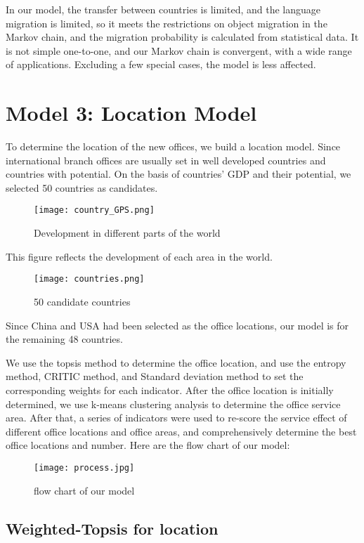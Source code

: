 \documentclass[12pt]{article}  %
\begin{document}
In our model, the transfer between countries is limited, and the language migration is limited, so it meets the restrictions on object migration in the Markov chain, and the migration probability is calculated from statistical data. It is not simple one-to-one, and our Markov chain is convergent, with a wide range of applications. Excluding a few special cases, the model is less affected.

\section{Model 3: Location Model}
To determine the location of the new offices, we build a location model. Since international branch offices are usually set in well developed countries and countries with potential. On the basis of countries' GDP and their potential, we selected 50 countries as candidates. 

\begin{figure}[H]
	\centering
	\texttt{[image: country\_GPS.png]}
	\caption{Development in different parts of the world}\label{fig:cnt_GDP}
\end{figure}

This figure reflects the development of each area in the world.

\begin{figure}[H]
	\centering
	\texttt{[image: countries.png]}
	\caption{50 candidate countries}\label{fig:cnt}
\end{figure}

Since China and USA had been selected as the office locations, our model is for the remaining 48 countries.

We use the topsis method to determine the office location, and use the entropy method, CRITIC method, and Standard deviation method to set the corresponding weights for each indicator. After the office location is initially determined, we use k-means clustering analysis to determine the office service area. After that, a series of indicators were used to re-score the service effect of different office locations and office areas, and comprehensively determine the best office locations and number. Here are the flow chart of our model:
\begin{figure}[H]
	\centering
	\texttt{[image: process.jpg]}
	\caption{flow chart of our model}\label{fig:flow_chart}
\end{figure}
\subsection{Weighted-Topsis for location}
\end{document}
